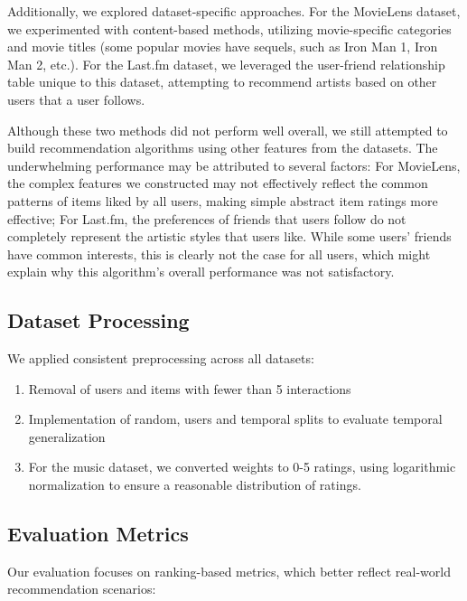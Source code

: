 \documentclass[sigconf,nonacm]{acmart} %
\begin{document}
Additionally, we explored dataset-specific approaches. For the MovieLens dataset, we experimented with content-based methods, utilizing movie-specific categories and movie titles (some popular movies have sequels, such as Iron Man 1, Iron Man 2, etc.). For the Last.fm dataset, we leveraged the user-friend relationship table unique to this dataset, attempting to recommend artists based on other users that a user follows.  

Although these two methods did not perform well overall, we still attempted to build recommendation algorithms using other features from the datasets. The underwhelming performance may be attributed to several factors: For MovieLens, the complex features we constructed may not effectively reflect the common patterns of items liked by all users, making simple abstract item ratings more effective; For Last.fm, the preferences of friends that users follow do not completely represent the artistic styles that users like. While some users' friends have common interests, this is clearly not the case for all users, which might explain why this algorithm's overall performance was not satisfactory.  

\subsection{Dataset Processing}
We applied consistent preprocessing across all datasets:
\begin{enumerate}
    \item Removal of users and items with fewer than 5 interactions
    \item Implementation of random, users and temporal splits to evaluate temporal generalization
    \item For the music dataset, we converted weights to 0-5 ratings, using logarithmic normalization to ensure a reasonable distribution of ratings.  
\end{enumerate}

\subsection{Evaluation Metrics}  
Our evaluation focuses on ranking-based metrics, which better reflect real-world recommendation scenarios:  
\end{document}
